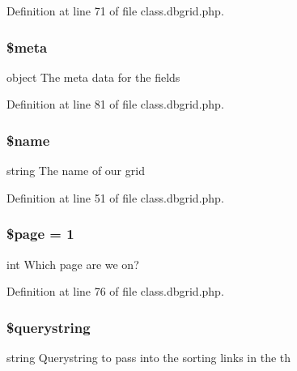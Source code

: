 Definition at line 71 of file class.\-dbgrid.\-php.

\hypertarget{class_db_grid_a9e6fc1ae0498be7d1e682f8bcc9299df}{
\subsubsection[{\$meta}]{\setlength{\rightskip}{0pt plus 5cm}\$meta}}\label{class_db_grid_a9e6fc1ae0498be7d1e682f8bcc9299df}
object The meta data for the fields 

Definition at line 81 of file class.\-dbgrid.\-php.

\hypertarget{class_db_grid_ab2fc40d43824ea3e1ce5d86dee0d763b}{
\subsubsection[{\$name}]{\setlength{\rightskip}{0pt plus 5cm}\$name\hspace{0.3cm}{\ttfamily [protected]}}}\label{class_db_grid_ab2fc40d43824ea3e1ce5d86dee0d763b}
string The name of our grid 

Definition at line 51 of file class.\-dbgrid.\-php.

\hypertarget{class_db_grid_a0a44e6760141442bb439b1ab1395d8ff}{
\subsubsection[{\$page}]{\setlength{\rightskip}{0pt plus 5cm}\$page = 1}}\label{class_db_grid_a0a44e6760141442bb439b1ab1395d8ff}
int Which page are we on? 

Definition at line 76 of file class.\-dbgrid.\-php.

\hypertarget{class_db_grid_a6bdad518c2534d667e646f89df728d54}{
\subsubsection[{\$querystring}]{\setlength{\rightskip}{0pt plus 5cm}\$querystring\hspace{0.3cm}{\ttfamily [protected]}}}\label{class_db_grid_a6bdad518c2534d667e646f89df728d54}
string Querystring to pass into the sorting links in the th 


